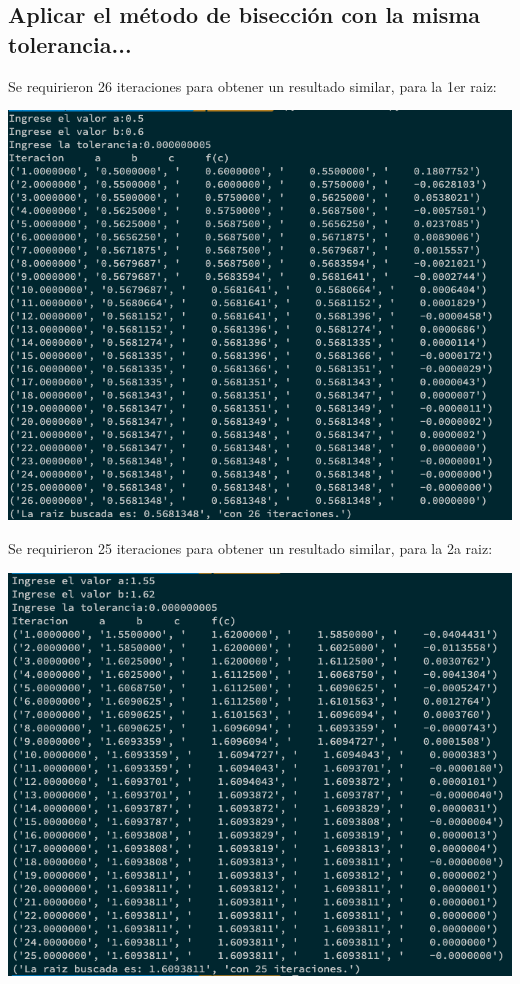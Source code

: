 \documentclass{article}
\begin{document}
\subsection{Aplicar el método de bisección con la misma tolerancia...}
Se requirieron 26 iteraciones para obtener un resultado similar, para la 1er raiz:

\includegraphics[scale=0.5]{salidaBiseccion1erRaiz.png} 

Se requirieron 25 iteraciones para obtener un resultado similar, para la 2a raiz:

\includegraphics[scale=0.5]{salidaBiseccion2aRaiz.png} 
\end{document}
